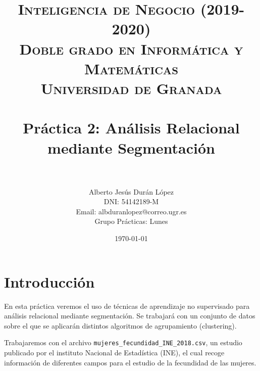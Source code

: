 

\title{	
	\normalfont \normalsize 
	\textsc{\textbf{Inteligencia de Negocio (2019-2020)} \\ Doble grado en Informática y Matemáticas \\ Universidad de Granada} \\ [25pt] 
	\horrule{0.5pt} \\[0.4cm]
	\huge Práctica 2: Análisis Relacional mediante Segmentación \\ 
	\horrule{2pt} \\[0.5cm] 
}

\author{Alberto Jesús Durán López \\
		DNI: 54142189-M \\
		Email: albduranlopez@correo.ugr.es \\
		Grupo Prácticas: Lunes} 
\date{\normalsize\today}



	\maketitle       %
	\newpage 
	\tableofcontents %
	\newpage
	
	
	
	
	\section{Introducción}
	
	En esta práctica veremos el uso de técnicas de aprendizaje no supervisado para análisis relacional mediante segmentación. Se trabajará con un conjunto de datos sobre el que se aplicarán distintos algoritmos de agrupamiento (clustering).
	
	Trabajaremos con el archivo \texttt{mujeres\_fecundidad\_INE\_2018.csv}, un estudio publicado por el instituto Nacional de Estadística (INE), el cual recoge información de diferentes campos para el estudio de la fecundidad de las mujeres.
	
